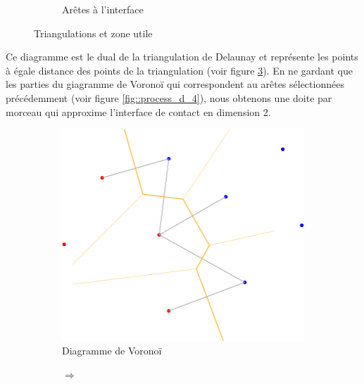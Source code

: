 \begin{figure}[ht]
\begin{subfigure}{0.45\textwidth}
  \caption{Arêtes à l'interface}
  \label{fig::process_d_2}
\end{subfigure}
\caption{Triangulations et zone utile}
\label{fig::delaunays_process_1}
\end{figure}


Ce diagramme est le dual de la triangulation de Delaunay et représente les points à
égale distance des points de la triangulation (voir figure \ref{fig::process_d_3}).
En ne gardant que les parties du giagramme de Voronoï qui correspondent au arêtes sélectionnées
précédemment (voir figure \ref{fig::process_d_4}), nous obtenons une doite par morceau
qui approxime l'interface de contact en dimension 2.

\begin{figure}[ht]
\centering
\begin{subfigure}{0.45\textwidth}
  \centering
  \includegraphics[width=\textwidth]{figures/process_d_3.png}
  \caption{Diagramme de Voronoï}
  \label{fig::process_d_3}
\end{subfigure}%
\begin{subfigure}{0.1\textwidth}
  \centering
  $\Longrightarrow$
\end{subfigure}%
\begin{subfigure}{0.45\textwidth}
  \centering

\end{subfigure}
\end{figure}
